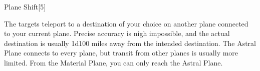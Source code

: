 \begin{spellsection}{Plane Shift}[5]
\begin{spellcontent}
\begin{spelltargetinginfo}
\end{spelltargetinginfo}
\begin{spelleffects}
\spelleffect
The targets teleport to a destination of your choice on another plane connected to your current plane.
Precise accuracy is nigh impossible, and the actual destination is usually 1d100 miles away from the intended destination.
The Astral Plane connects to every plane, but transit from other planes is usually more limited. From the Material Plane, you can only reach the Astral Plane.
\end{spelleffects}
\end{spellcontent}
\begin{spellfooter}
\end{spellfooter}
\begin{spellsubcontent}
\end{spellsubcontent}
\end{spellsection}
